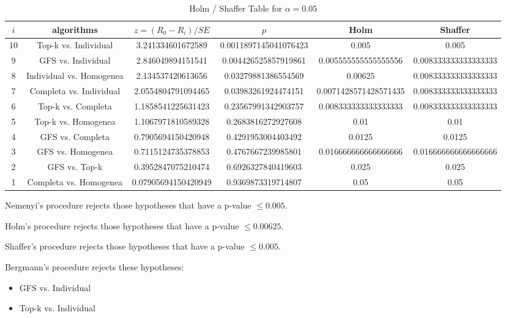 \documentclass[a4paper,10pt]{article}
\begin{document}
\begin{landscape}
\begin{table}[!htp]
\centering\tiny
\caption{Holm / Shaffer Table for $\alpha=0.05$}
\begin{tabular}{cccccc}
$i$&algorithms&$z=(R_0 - R_i)/SE$&$p$&Holm&Shaffer\\
\hline
10&Top-k vs. Individual&3.241334601672589&0.0011897145041076423&0.005&0.005\\
9&GFS vs. Individual&2.846049894151541&0.004426525857919861&0.005555555555555556&0.008333333333333333\\
8&Individual vs. Homogenea&2.134537420613656&0.03279881386554569&0.00625&0.008333333333333333\\
7&Completa vs. Individual&2.0554804791094465&0.03983261924474151&0.0071428571428571435&0.008333333333333333\\
6&Top-k vs. Completa&1.1858541225631423&0.23567991342903757&0.008333333333333333&0.008333333333333333\\
5&Top-k vs. Homogenea&1.1067971810589328&0.2683816272927608&0.01&0.01\\
4&GFS vs. Completa&0.7905694150420948&0.4291953004403492&0.0125&0.0125\\
3&GFS vs. Homogenea&0.7115124735378853&0.4767667239985801&0.016666666666666666&0.016666666666666666\\
2&GFS vs. Top-k&0.3952847075210474&0.6926327840419603&0.025&0.025\\
1&Completa vs. Homogenea&0.07905694150420949&0.9369873319714807&0.05&0.05\\
\hline
\end{tabular}
\end{table}
Nemenyi's procedure rejects those hypotheses that have a p-value $\le0.005$.


Holm's procedure rejects those hypotheses that have a p-value $\le0.00625$.


Shaffer's procedure rejects those hypotheses that have a p-value $\le0.005$.


Bergmann's procedure rejects these hypotheses:


\begin{itemize}


\item GFS vs. Individual
\item Top-k vs. Individual
\end{itemize}



\end{landscape}
\end{document}
